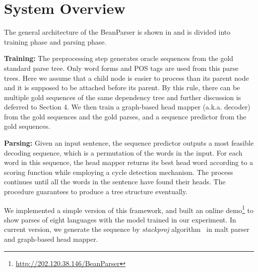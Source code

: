\section{System Overview}
The general architecture of the BeanParser is shown in 
and is divided into training phase and parsing phase.

{\bf Training:} The preprocessing step generates oracle sequences
from the gold standard parse tree. Only word forms and POS tags are
used from this parse trees. Here we assume that a child node is
easier to process than its parent node and it is supposed to be attached
before its parent. By this rule, there can be multiple gold sequences
of the same dependency tree and further discussion is
deferred to Section 4.
We then train a graph-based head mapper (a.k.a. decoder)
from the gold sequences and the gold parses, and a sequence predictor
from the gold sequences.

{\bf Parsing:} Given an input sentence, the sequence predictor
outputs a most feasible decoding sequence, which is a permutation of
the words in the input. For each word in this sequence,
the head mapper returns its best head word according to a scoring function
while employing a cycle detection mechanism.
The process continues until all the words in the sentence have found their
heads.
The procedure guarantees to produce a tree structure eventually.

We implemented a simple version of this framework,
and built an online demo\footnote{\url{http://202.120.38.146/BeanParser}} to show parses of eight languages with the model
trained in our experiment.
In current version, we generate the sequence by
{\em stackproj} algorithm~\cite{nivre2009non} in
malt parser and graph-based head mapper.

